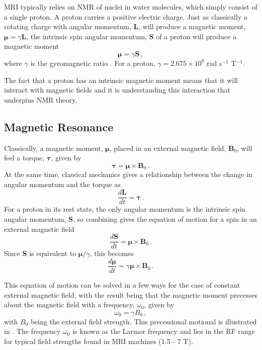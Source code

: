 \ac{MRI} typically relies on \ac{NMR} of  nuclei in water molecules, which simply consist of a single proton.
A proton carries a positive electric charge.
Just as classically a rotating charge with angular momentum, $\mathbf{L}$, will produce a magnetic moment, $
\boldsymbol{\mu} = \gamma \mathbf{L}$, the intrinsic spin angular momentum, $\mathbf{S}$ of a proton will produce a magnetic moment 
\begin{equation}
\label{eq:magnmom}
\boldsymbol{\mu} = \gamma \mathbf{S} \,,
\end{equation}
where $\gamma$ is the gyromagnetic ratio \cite{Levitt2008}.
For a proton, $\gamma = 2.675 \times 10^8$ rad s$^{-1}$ T$^{-1}$.

The fact that a proton has an intrinsic magnetic moment means that it will interact with magnetic fields and it is understanding this interaction that underpins \ac{NMR} theory.


\subsection{Magnetic Resonance}
\label{sec:bg_resonance}
Classically, a magnetic moment, $\boldsymbol{\mu}$, placed in an external magnetic field, $\mathbf{B}_0$, will feel a torque, $\boldsymbol{\tau}$, given by \cite{Haacke1999} 
\begin{equation}
\label{eq:torque}
\boldsymbol{\tau} = \boldsymbol{\mu} \times \mathbf{B}_0 \,.
\end{equation}
At the same time, classical mechanics gives a relationship between the change in angular momentum and the torque as \cite{Haacke1999} 
\begin{equation}
\label{eq:dLdt}
\frac{d\mathbf{L}}{dt} = \boldsymbol{\tau}\,. 
\end{equation}
For a proton in its rest state, the only angular momentum is the intrinsic spin angular momentum, $\mathbf{S}$, so combining  gives the equation of motion for a spin in an external magnetic field
\begin{equation}
\frac{d\mathbf{S}}{dt} = \boldsymbol{\mu} \times \mathbf{B}_0 \,.
\end{equation}
Since $\mathbf{S}$ is equivalent to $\boldsymbol{\mu}/\gamma$, this becomes
\begin{equation}
\frac{d\boldsymbol{\mu}}{dt} = \gamma\boldsymbol{\mu} \times \mathbf{B}_0\,.
\label{eq:dmudt}
\end{equation}

This equation of motion can be solved in a few ways for the case of constant external magnetic field, with the result being that the magnetic moment precesses about the magnetic field with a frequency, $\omega_0$, given by\cite{Levitt2008}
\begin{equation}
\label{eq:LarmorFreq}
\omega_0 = \gamma B_0\,,
\end{equation}
with $B_0$ being the external field strength. 
This precessional motional is illustrated in .
The frequency $\omega_0$ is known as the Larmor frequency and lies in the \ac{RF} range for typical field strengths found in MRI machines (1.5 - 7 T).

